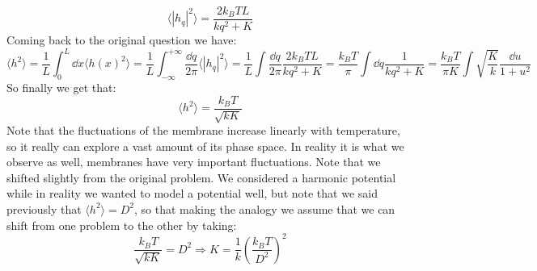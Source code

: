 \documentclass[10pt,a4paper]{book}
\begin{document}
\[
\langle |h_q|^2 \rangle = \frac{2 k_B T L}{k q^2 + K}
\]
Coming back to the original question we have:
\[
\langle h^2 \rangle = \frac{1}{L} \int_0^L \dd x \langle h(x)^2 \rangle = \frac{1}{L} \int_{-\infty}^{+\infty} \frac{\dd q}{2\pi} \langle |h_q|^2 \rangle = \frac{1}{L}\int \frac{\dd q}{2\pi}\frac{2 k_B T L}{kq^2 + K} = \frac{k_B T}{\pi} \int \dd q \frac{1}{kq^2 + K} = \frac{k_B T}{\pi K}\int  \sqrt{\frac{K}{k}} \frac{\dd u}{1 + u^2}
\]
So finally we get that:
\[
\langle h^2 \rangle = \frac{k_B T}{\sqrt{k K}}
\]
Note that the fluctuations of the membrane increase linearly with temperature, so it really can explore a vast amount of its phase space. In reality it is what we observe as well, membranes have very important fluctuations.
Note that we shifted slightly from the original problem. We considered a harmonic potential while in reality we wanted to model a potential well, but note that we said previously that $\langle h^2 \rangle = D^2$, so that making the analogy we assume that we can shift from one problem to the other by taking:
\[
\frac{k_B T}{\sqrt{k K}} = D^2 \Rightarrow K = \frac{1}{k}\left(\frac{k_B T}{D^2}\right)^2
\]
\end{document}
